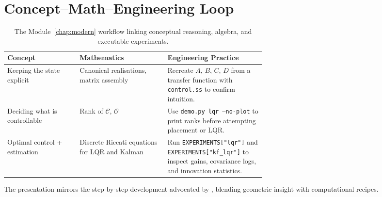 \section{Concept--Math--Engineering Loop}
\begin{table}[h]
    \centering
    \small
    \renewcommand{\arraystretch}{1.2}
    \begin{tabularx}{\linewidth}{|>{\raggedright\arraybackslash}p{0.28\linewidth}|>{\raggedright\arraybackslash}p{0.34\linewidth}|>{\raggedright\arraybackslash}X|}
        \hline
        \textbf{Concept} & \textbf{Mathematics} & \textbf{Engineering Practice} \\
        \hline
        Keeping the state explicit & Canonical realisations, matrix assembly & Recreate $A$, $B$, $C$, $D$ from a transfer function with \texttt{control.ss} to confirm intuition. \\
        \hline
        Deciding what is controllable & Rank of $\mathcal{C}$, $\mathcal{O}$ & Use \texttt{demo.py lqr --no-plot} to print ranks before attempting placement or LQR. \\
        \hline
        Optimal control + estimation & Discrete Riccati equations for LQR and Kalman & Run \texttt{EXPERIMENTS["lqr"]} and \texttt{EXPERIMENTS["kf\_lqr"]} to inspect gains, covariance logs, and innovation statistics. \\
        \hline
    \end{tabularx}
    \caption{The Module~\ref{chap:modern} workflow linking conceptual reasoning, algebra, and executable experiments.}
\end{table}

The presentation mirrors the step-by-step development advocated by \textcite{ljung2012control}, blending geometric insight with computational recipes.

